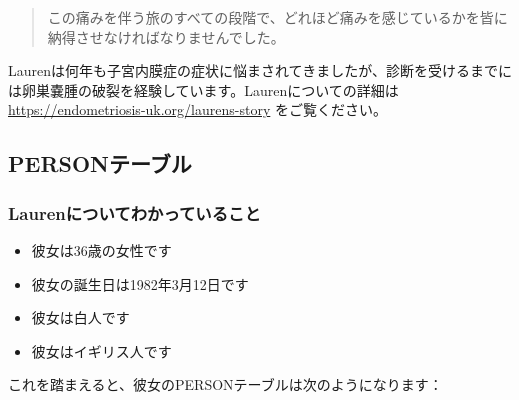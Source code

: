 \documentclass[
  11pt]{book}
\providecommand{\tightlist}{%
  \setlength{\itemsep}{0pt}\setlength{\parskip}{0pt}}
\theoremstyle{definition}
\theoremstyle{definition}
\theoremstyle{definition}
\theoremstyle{definition}
\theoremstyle{remark}
\begin{document}
\begin{quote}
この痛みを伴う旅のすべての段階で、どれほど痛みを感じているかを皆に納得させなければなりませんでした。
\end{quote}

Laurenは何年も子宮内膜症の症状に悩まされてきましたが、診断を受けるまでには卵巣嚢腫の破裂を経験しています。Laurenについての詳細は\url{https://endometriosis-uk.org/laurens-story} をご覧ください。

\subsection{PERSONテーブル}\label{person}

\subsubsection*{Laurenについてわかっていること}\label{laurenux306bux3064ux3044ux3066ux308fux304bux3063ux3066ux3044ux308bux3053ux3068}

\begin{itemize}
\tightlist
\item
  彼女は36歳の女性です
\item
  彼女の誕生日は1982年3月12日です
\item
  彼女は白人です
\item
  彼女はイギリス人です
\end{itemize}

これを踏まえると、彼女のPERSONテーブルは次のようになります：
\end{document}

